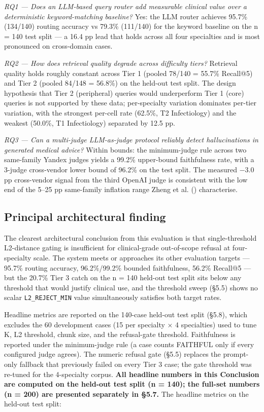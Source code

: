 \documentclass[
  american,
  a4paper,
]{article}
\begin{document}
\emph{RQ1 --- Does an LLM-based query router add measurable clinical
value over a deterministic keyword-matching baseline?} Yes: the LLM
router achieves 95.7\% (134/140) routing accuracy vs 79.3\% (111/140)
for the keyword baseline on the n = 140 test split --- a 16.4 pp lead
that holds across all four specialties and is most pronounced on
cross-domain cases.

\emph{RQ2 --- How does retrieval quality degrade across difficulty
tiers?} Retrieval quality holds roughly constant across Tier 1 (pooled
78/140 = 55.7\% Recall@5) and Tier 2 (pooled 84/148 = 56.8\%) on the
held-out test split. The design hypothesis that Tier 2 (peripheral)
queries would underperform Tier 1 (core) queries is not supported by
these data; per-specialty variation dominates per-tier variation, with
the strongest per-cell rate (62.5\%, T2 Infectiology) and the weakest
(50.0\%, T1 Infectiology) separated by 12.5 pp.

\emph{RQ3 --- Can a multi-judge LLM-as-judge protocol reliably detect
hallucinations in generated medical advice?} Within bounds: the
minimum-judge rule across two same-family Yandex judges yields a 99.2\%
upper-bound faithfulness rate, with a 3-judge cross-vendor lower bound
of 96.2\% on the test split. The measured −3.0 pp cross-vendor signal
from the third OpenAI judge is consistent with the low end of the 5--25
pp same-family inflation range Zheng et al.
() characterise.

\subsection{Principal architectural
finding}\label{principal-architectural-finding}

The clearest architectural conclusion from this evaluation is that
single-threshold L2-distance gating is insufficient for clinical-grade
out-of-scope refusal at four-specialty scale. The system meets or
approaches its other evaluation targets --- 95.7\% routing accuracy,
96.2\%/99.2\% bounded faithfulness, 56.2\% Recall@5 --- but the 20.7\%
Tier 3 catch on the n = 140 held-out test split sits below any threshold
that would justify clinical use, and the threshold sweep (§5.5) shows no
scalar \texttt{L2\_REJECT\_MIN} value simultaneously satisfies both
target rates.

Headline metrics are reported on the 140-case held-out test split
(§5.8), which excludes the 60 development cases (15 per specialty × 4
specialties) used to tune K, L2 threshold, chunk size, and the
refusal-gate threshold. Faithfulness is reported under the minimum-judge
rule (a case counts FAITHFUL only if every configured judge agrees). The
numeric refusal gate (§5.5) replaces the prompt-only fallback that
previously failed on every Tier 3 case; the gate threshold was re-tuned
for the 4-specialty corpus. \textbf{All headline numbers in this
Conclusion are computed on the held-out test split (n = 140); the
full-set numbers (n = 200) are presented separately in §5.7.} The
headline metrics on the held-out test split:
\end{document}
